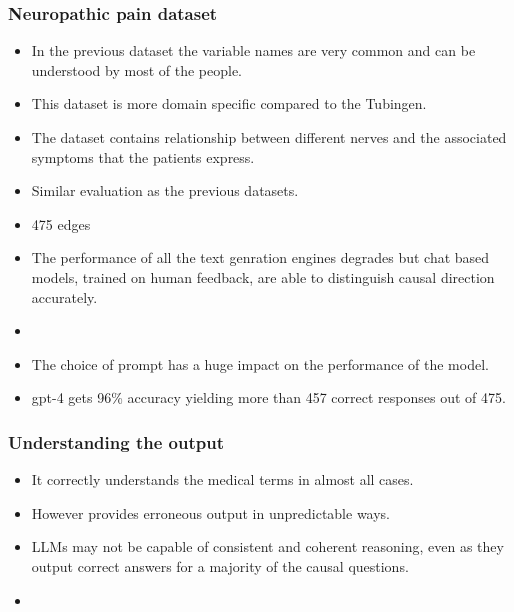 \documentclass{beamer}
\begin{document}
\begin{frame}
	\frametitle{Neuropathic pain dataset}
	\begin{itemize}
		\item In the previous dataset the variable names are very common and
			can be understood by most of the people.
		\item This dataset is more domain specific compared to the Tubingen.
		\item The dataset contains relationship between different nerves and 
			the associated symptoms that the patients express.
		\item Similar evaluation as the previous datasets.
		\item 475 edges
		\item The performance of all the text genration engines degrades but
			chat based models, trained on human feedback, are able to 
			distinguish causal direction accurately.
		\item {}
		\item The choice of prompt has a huge impact on the performance of the
			model.
		\item gpt-4 gets 96\% accuracy yielding more than 457 correct responses
			out of 475.
	\end{itemize}
\end{frame}

\begin{frame}
	\frametitle{Understanding the output}
	\begin{itemize}
		\item It correctly understands the medical terms in almost all cases.
		\item However provides erroneous output in unpredictable ways.
		\item LLMs may not be capable of consistent and coherent reasoning, even
			as they output correct answers for a majority of the causal 
			questions.
		\item {}
	\end{itemize}
\end{frame}
\end{document}
